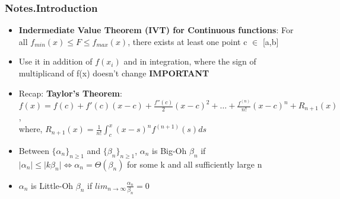 \documentclass[12pt,letterpaper]{article}
\newcommand\asgnname{Notes}         %
\newenvironment{answer}[1]{
  \subsubsection*{%
  \asgnname.#1}
}{\newpage}
\begin{document}
\begin{answer}{Introduction}
\begin{itemize}
\begin{itemize}
        \end{itemize}
        \item \textbf{Indermediate Value Theorem (IVT) for Continuous functions}: For all $f_{min}(x) \le F \le f_{max}(x)$, there exists at least one point c $\in$ [a,b]
        \item Use it in addition of $f(x_i)$ and in integration, where the sign of multiplicand of f(x) doesn't change \textbf{IMPORTANT}
        \item Recap: \textbf{Taylor's Theorem}: \\
        $f(x) = f(c)+f'(c)(x-c)+\frac{f''(c)}{2}(x-c)^2 + \ldots + \frac{f^{(n)}}{n!}(x-c)^n + R_{n+1}(x)$,\\
        where, $R_{n+1}(x)=\frac{1}{n!}\int _c^x (x-s)^n f^{(n+1)}(s) ds$
        \item Between $\{\alpha _n\}_{n \ge 1}$ and $\{\beta _n\}_{n \ge 1}$, $\alpha _n$ is Big-Oh $\beta _n$ if $\mid \alpha _n \mid \le \mid k\beta _n \mid \iff \alpha _n = \Theta(\beta _n)$ for some k and all sufficiently large n
        \item $\alpha _n$ is Little-Oh $\beta _n$ if $lim_{n\to \infty} \frac{\alpha _n}{\beta _n} = 0$
        
    \end{itemize}
\end{answer}
\end{document}
